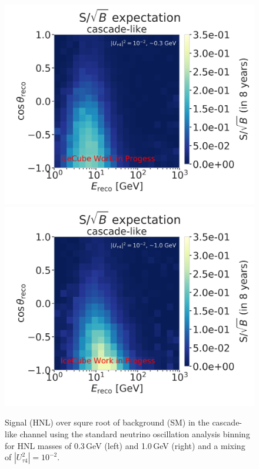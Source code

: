 \documentclass[a4paper,11pt]{article}
\begin{document}
\begin{figure}[h!]
  \includegraphics[trim = 0cm 0cm 7.15cm 2.0cm, clip, height=0.4\linewidth]{figures/2_d_S_over_sqrt(B)_taupede_reco_energy_taupede_reco_coszen_around_0.3_GeV_new.png}
  \includegraphics[trim = 0cm 0cm 0cm 2.0cm, clip, height=0.4\linewidth]{figures/2_d_S_over_sqrt(B)_taupede_reco_energy_taupede_reco_coszen_around_1.0_GeV_new.png}
  \caption{Signal (HNL) over squre root of background (SM) in the cascade-like channel using the standard neutrino oscillation analysis binning for HNL masses of 0.3\,GeV (left) and 1.0\,GeV (right) and a mixing of $|U_{\tau4}^2|=10^{-2}$.}
  \label{fig:s_over_sqrt_B_HNL}
\end{figure}
\end{document}

